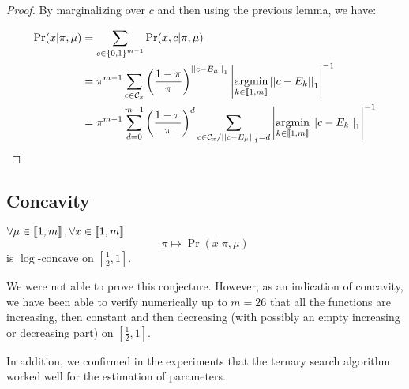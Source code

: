 \begin{proof}
    By marginalizing over $c$ and then using the previous lemma, we have:

\begin{align}
    \Pr(x | \pi, \mu)
    &= \sum_{c \in \left\{ 0, 1 \right\}^{m-1}} \Pr(x, c | \pi, \mu)\\
    &= \pi^{m-1} \sum_{c \in \mathcal{C}_x} \left(\frac{1 - \pi}{\pi}\right)^{\left|\left|c - E_{\mu}\right|\right|_1} \left|\operatorname*{argmin}_{k \in \left\llbracket1, m\right\rrbracket} \left|\left|c - E_k\right|\right|_1\right|^{-1}\\
    &= \pi^{m-1} \sum_{d = 0}^{m-1} \left(\frac{1 - \pi}{\pi}\right)^d \sum_{c \in \mathcal{C}_x / \left|\left|c - E_{\mu}\right|\right|_1 = d}  \left|\operatorname*{argmin}_{k \in \left\llbracket1, m\right\rrbracket} \left|\left|c - E_k\right|\right|_1\right|^{-1}
\end{align}
\end{proof}


\subsection{Concavity}

\begin{conjecture}
    \label{thm:log_likelihood_concave_appendix}
    $\forall \mu \in \left\llbracket1, m\right\rrbracket, \forall x \in \left\llbracket1, m\right\rrbracket$
    \[ \pi \mapsto \Pr(x | \pi, \mu) \]
    is $\log$-concave on $\left[\frac{1}{2}, 1\right]$.
\end{conjecture}

We were not able to prove this conjecture. However, as an indication of concavity, we have been able to verify numerically up to $m=26$ that all the functions are increasing, then constant and then decreasing (with possibly an empty increasing or decreasing part) on $\left[\frac{1}{2}, 1\right]$. 

In addition, we confirmed in the experiments that the ternary search algorithm worked well for the estimation of parameters.

